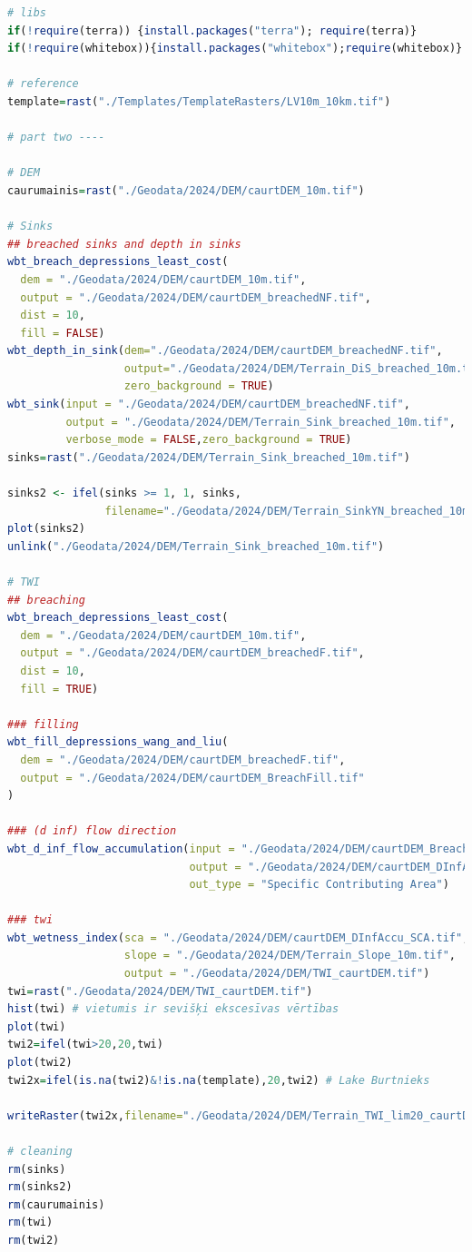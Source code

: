 \documentclass[
]{book}
\begin{document}
\begin{lstlisting}[language=R]
# libs
if(!require(terra)) {install.packages("terra"); require(terra)}
if(!require(whitebox)){install.packages("whitebox");require(whitebox)}

# reference
template=rast("./Templates/TemplateRasters/LV10m_10km.tif")

# part two ----

# DEM
caurumainis=rast("./Geodata/2024/DEM/caurtDEM_10m.tif")

# Sinks
## breached sinks and depth in sinks
wbt_breach_depressions_least_cost(
  dem = "./Geodata/2024/DEM/caurtDEM_10m.tif",
  output = "./Geodata/2024/DEM/caurtDEM_breachedNF.tif",
  dist = 10,
  fill = FALSE)
wbt_depth_in_sink(dem="./Geodata/2024/DEM/caurtDEM_breachedNF.tif",
                  output="./Geodata/2024/DEM/Terrain_DiS_breached_10m.tif",
                  zero_background = TRUE)
wbt_sink(input = "./Geodata/2024/DEM/caurtDEM_breachedNF.tif",
         output = "./Geodata/2024/DEM/Terrain_Sink_breached_10m.tif",
         verbose_mode = FALSE,zero_background = TRUE)
sinks=rast("./Geodata/2024/DEM/Terrain_Sink_breached_10m.tif")

sinks2 <- ifel(sinks >= 1, 1, sinks,
               filename="./Geodata/2024/DEM/Terrain_SinkYN_breached_10m.tif")
plot(sinks2)
unlink("./Geodata/2024/DEM/Terrain_Sink_breached_10m.tif")

# TWI
## breaching
wbt_breach_depressions_least_cost(
  dem = "./Geodata/2024/DEM/caurtDEM_10m.tif",
  output = "./Geodata/2024/DEM/caurtDEM_breachedF.tif",
  dist = 10,
  fill = TRUE)

### filling
wbt_fill_depressions_wang_and_liu(
  dem = "./Geodata/2024/DEM/caurtDEM_breachedF.tif",
  output = "./Geodata/2024/DEM/caurtDEM_BreachFill.tif"
)

### (d inf) flow direction
wbt_d_inf_flow_accumulation(input = "./Geodata/2024/DEM/caurtDEM_BreachFill.tif",
                            output = "./Geodata/2024/DEM/caurtDEM_DInfAccu_SCA.tif",
                            out_type = "Specific Contributing Area")

### twi
wbt_wetness_index(sca = "./Geodata/2024/DEM/caurtDEM_DInfAccu_SCA.tif",
                  slope = "./Geodata/2024/DEM/Terrain_Slope_10m.tif",
                  output = "./Geodata/2024/DEM/TWI_caurtDEM.tif")
twi=rast("./Geodata/2024/DEM/TWI_caurtDEM.tif")
hist(twi) # vietumis ir sevišķi ekscesīvas vērtības
plot(twi)
twi2=ifel(twi>20,20,twi)
plot(twi2)
twi2x=ifel(is.na(twi2)&!is.na(template),20,twi2) # Lake Burtnieks

writeRaster(twi2x,filename="./Geodata/2024/DEM/Terrain_TWI_lim20_caurtDEM.tif")

# cleaning
rm(sinks)
rm(sinks2)
rm(caurumainis)
rm(twi)
rm(twi2)
\end{lstlisting}
\end{document}
